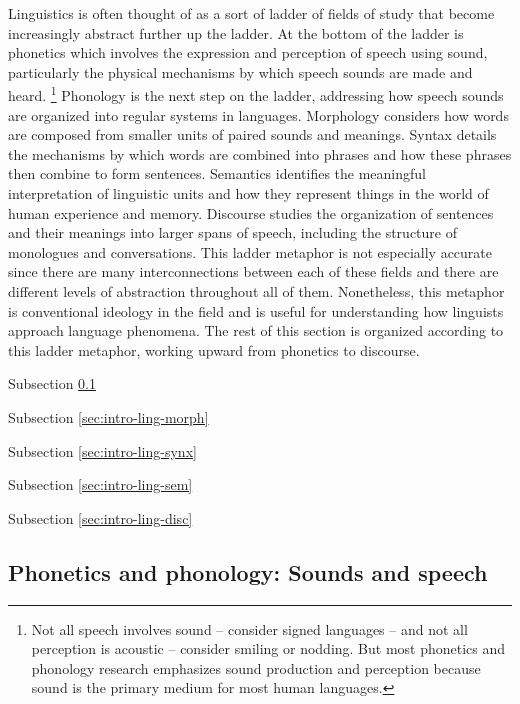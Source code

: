 Linguistics is often thought of as a sort of ladder of fields of study that become increasingly abstract further up the ladder.
At the bottom of the ladder is phonetics which involves the expression and perception of speech using sound, particularly the physical mechanisms by which speech sounds are made and heard.%
\footnote{Not all speech involves sound – consider signed languages – and not all perception is acoustic – consider smiling or nodding. But most phonetics and phonology research emphasizes sound production and perception because sound is the primary medium for most human languages.}
Phonology is the next step on the ladder, addressing how speech sounds are organized into regular systems in languages.
Morphology considers how words are composed from smaller units of paired sounds and meanings.
Syntax details the mechanisms by which words are combined into phrases and how these phrases then combine to form sentences.
Semantics identifies the meaningful interpretation of linguistic units and how they represent things in the world of human experience and memory.
Discourse studies the organization of sentences and their meanings into larger spans of speech, including the structure of monologues and conversations.
This ladder metaphor is not especially accurate since there are many interconnections between each of these fields and there are different levels of abstraction throughout all of them.
Nonetheless, this metaphor is conventional ideology in the field and is useful for understanding how linguists approach language phenomena.
The rest of this section is organized according to this ladder metaphor, working upward from phonetics to discourse.

Subsection \ref{sec:intro-ling-phon} 

Subsection \ref{sec:intro-ling-morph}

Subsection \ref{sec:intro-ling-synx}

Subsection \ref{sec:intro-ling-sem}

Subsection \ref{sec:intro-ling-disc}

\subsection{Phonetics and phonology: Sounds and speech}\label{sec:intro-ling-phon}

